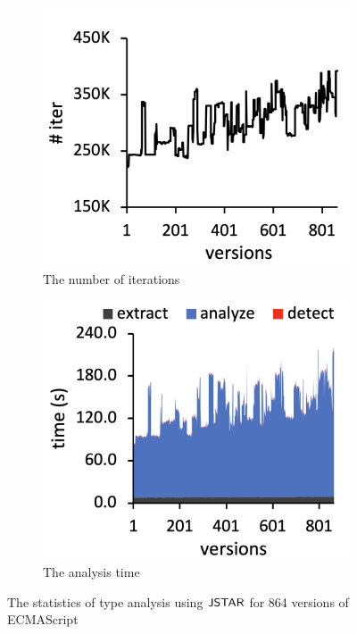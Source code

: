 \begin{figure}
\begin{subfigure}[b]{0.24\textwidth}
    \includegraphics[width=\textwidth]{img/iter}
    \caption{The number of iterations}
  \end{subfigure}
  \begin{subfigure}[b]{0.24\textwidth}
    \includegraphics[width=\textwidth]{img/time}
    \caption{The analysis time}
  \end{subfigure}
  \caption{The statistics of type analysis using $\tool$ for 864 versions of
  ECMAScript}
  \vspace*{-1em}
  \label{fig:stat}
\end{figure}


